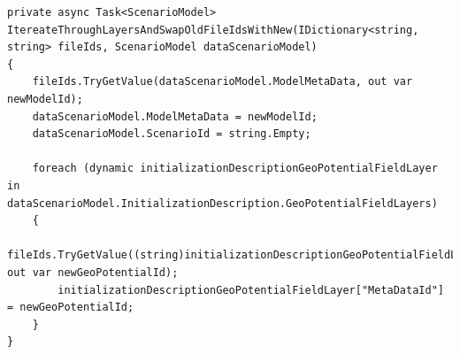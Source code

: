 \newpage
\begin{lstlisting}[language={[Sharp]C}, caption={A method in RetrieveScenarios to swap Attributes}, captionpos=b,label={lst:swapCode}]
private async Task<ScenarioModel> ItereateThroughLayersAndSwapOldFileIdsWithNew(IDictionary<string, string> fileIds, ScenarioModel dataScenarioModel)
{
    fileIds.TryGetValue(dataScenarioModel.ModelMetaData, out var newModelId);
    dataScenarioModel.ModelMetaData = newModelId;
    dataScenarioModel.ScenarioId = string.Empty;
    
    foreach (dynamic initializationDescriptionGeoPotentialFieldLayer in dataScenarioModel.InitializationDescription.GeoPotentialFieldLayers)
    {
        fileIds.TryGetValue((string)initializationDescriptionGeoPotentialFieldLayer["MetaDataId"], out var newGeoPotentialId);
        initializationDescriptionGeoPotentialFieldLayer["MetaDataId"] = newGeoPotentialId;
    }
}
\end{lstlisting}